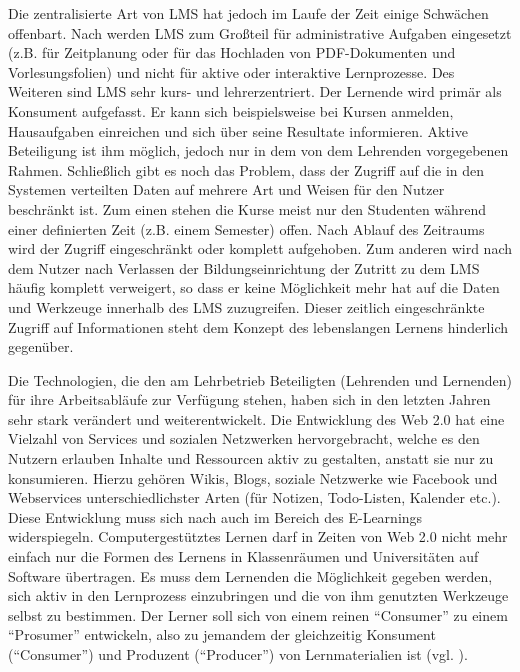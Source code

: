 Die zentralisierte Art von LMS hat jedoch im Laufe der Zeit einige Schwächen offenbart. Nach \cite{Mott2010} werden LMS zum Großteil für administrative Aufgaben eingesetzt (z.B. für Zeitplanung oder für das Hochladen von PDF-Dokumenten und Vorlesungsfolien) und nicht für aktive oder interaktive Lernprozesse. Des Weiteren sind LMS sehr kurs- und lehrerzentriert. Der Lernende wird primär als Konsument aufgefasst. Er kann sich beispielsweise bei Kursen anmelden, Hausaufgaben einreichen und sich über seine Resultate informieren. Aktive Beteiligung ist ihm möglich, jedoch nur in dem von dem Lehrenden vorgegebenen Rahmen.
Schließlich gibt es noch das Problem, dass der Zugriff auf die in den Systemen verteilten Daten auf mehrere Art und Weisen für den Nutzer beschränkt ist. Zum einen stehen die Kurse meist nur den Studenten während einer definierten Zeit (z.B. einem Semester) offen. Nach Ablauf des Zeitraums wird der Zugriff eingeschränkt oder komplett aufgehoben. Zum anderen wird nach \cite{Schaffert2008a} dem Nutzer nach Verlassen der Bildungseinrichtung der Zutritt zu dem LMS häufig komplett verweigert, so dass er keine Möglichkeit mehr hat auf die Daten und Werkzeuge innerhalb des LMS zuzugreifen. Dieser zeitlich eingeschränkte Zugriff auf Informationen steht dem Konzept des lebenslangen Lernens hinderlich gegenüber.

Die Technologien, die den am Lehrbetrieb Beteiligten (Lehrenden und Lernenden) für ihre Arbeitsabläufe zur Verfügung stehen, haben sich in den letzten Jahren sehr stark verändert und weiterentwickelt. Die Entwicklung des Web 2.0 hat eine Vielzahl von Services und sozialen Netzwerken hervorgebracht, welche es den Nutzern erlauben Inhalte und Ressourcen aktiv zu gestalten, anstatt sie nur zu konsumieren. Hierzu gehören Wikis, Blogs, soziale Netzwerke wie Facebook und Webservices unterschiedlichster Arten (für Notizen, Todo-Listen, Kalender etc.).
Diese Entwicklung muss sich nach \cite{Attwell2007} auch im Bereich des E-Learnings widerspiegeln. Computergestütztes Lernen darf in Zeiten von Web 2.0 nicht mehr einfach nur die Formen des Lernens in Klassenräumen und Universitäten auf Software übertragen. Es muss dem Lernenden die Möglichkeit gegeben werden, sich aktiv in den Lernprozess einzubringen und die von ihm genutzten Werkzeuge selbst zu bestimmen. Der Lerner soll sich von einem reinen "`Consumer"' zu einem "`Prosumer"' entwickeln, also zu jemandem der gleichzeitig Konsument ("`Consumer"') und Produzent ("`Producer"') von Lernmaterialien ist (vgl. \cite{Schaffert2008a}).

